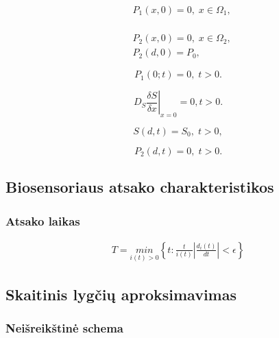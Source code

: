 \documentclass[12pt, a4paper, lithuanian]{article}
\begin{document}
\begin{equation}
\begin{aligned}
    &P_1(x, 0) = 0,\; x \in \Omega_1,\\
\end{aligned}
\end{equation}

\begin{equation}
\begin{aligned}
    &P_2(x, 0) = 0,\; x \in \Omega_2,\\
    &P_2(d, 0) = P_0,
\end{aligned}
\end{equation}

\begin{equation} 
    P_1(0;t)=0, \; t>0.
\end{equation}

\begin{equation} 
    \left. D_S \frac{\delta S}{\delta x} \right|_{x=0} = 0, t>0.
\end{equation}

\begin{equation} 
    S(d, t) = S_0,\; t>0,
\end{equation}

\begin{equation} 
    P_2(d, t) = 0,\; t>0.
\end{equation}

\subsection{Biosensoriaus atsako charakteristikos}
\subsubsection{Atsako laikas}
\begin{equation} 
\begin{aligned}
    T = \underset{i(t)>0}{min}\left\{t:\frac{t}{i(t)} \left| \frac{d_i(t)}{dt}
    \right| < \epsilon \right\}
\end{aligned}
\end{equation}

\subsection{Skaitinis lygčių aproksimavimas}
\subsubsection{Neišreikštinė schema}
\end{document}
